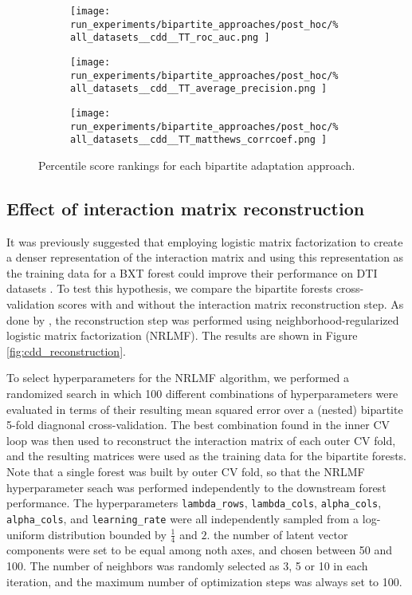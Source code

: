 \begin{figure*}
    \begin{subfigure}{0.32\textwidth}
        \texttt{[image: 
            run\_experiments/bipartite\_approaches/post\_hoc/\%
            all\_datasets\_\_cdd\_\_TT\_roc\_auc.png
        ]}
    \end{subfigure}
    \begin{subfigure}{0.32\textwidth}
        \texttt{[image: 
            run\_experiments/bipartite\_approaches/post\_hoc/\%
            all\_datasets\_\_cdd\_\_TT\_average\_precision.png
        ]}
    \end{subfigure}
    \begin{subfigure}{0.32\textwidth}
        \texttt{[image: 
            run\_experiments/bipartite\_approaches/post\_hoc/\%
            all\_datasets\_\_cdd\_\_TT\_matthews\_corrcoef.png
        ]}
    \end{subfigure}
    \caption{Percentile score rankings for each bipartite adaptation approach.}
    \label{fig:cdd_adapters}
\end{figure*}

\subsection{Effect of interaction matrix reconstruction}

It was previously suggested that employing logistic matrix factorization to create a denser representation of the interaction matrix and using this representation as the training data for a BXT forest could improve their performance on DTI datasets \cite{Pliakos_2020}. To test this hypothesis, we compare the bipartite forests cross-validation scores with and without the interaction matrix reconstruction step. As done by \cite{Pliakos_2020}, the reconstruction step was performed using neighborhood-regularized logistic matrix factorization (NRLMF)\cite{}. The results are shown in Figure \ref{fig:cdd_reconstruction}.

To select hyperparameters for the NRLMF algorithm, we performed a randomized search in which 100 different combinations of hyperparameters were evaluated in terms of their resulting mean squared error over a (nested) bipartite 5-fold diagnonal cross-validation. The best combination found in the inner CV loop was then used to reconstruct the interaction matrix of each outer CV fold, and the resulting matrices were used as the training data for the bipartite forests. Note that a single forest was built by outer CV fold, so that the NRLMF hyperparameter seach was performed independently to the downstream forest performance. The hyperparameters \texttt{lambda\_rows}, \texttt{lambda\_cols}, \texttt{alpha\_cols}, \texttt{alpha\_cols}, and \texttt{learning\_rate} were all independently sampled from a log-uniform distribution bounded by $\frac{1}{4}$ and $2$. the number of latent vector components were set to be equal among noth axes, and chosen between 50 and 100. The number of neighbors was randomly selected as 3, 5 or 10 in each iteration, and the maximum number of optimization steps was always set to 100.

